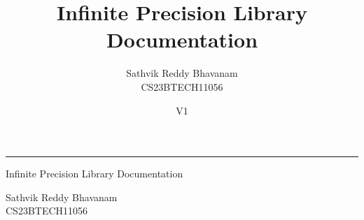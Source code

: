 \documentclass{article} %
\title{\huge \sffamily Infinite Precision Library Documentation}
\author{\sffamily Sathvik Reddy Bhavanam\\[2mm] \sffamily CS23BTECH11056}
\date{V1}
\begin{document}
\thispagestyle{empty}
\vspace*{3cm}
\hspace*{-7mm}\rule{\linewidth}{3pt}
\vspace*{1cm}
\begin{center}
	{\Huge \sffamily Infinite Precision Library Documentation} \\[3em]
\end{center}
{\hfill \Large \sffamily Sathvik Reddy Bhavanam} \\[2em]
{\vspace*{1em} \hfill\large \sffamily CS23BTECH11056}

\newpage


\tableofcontents
\newpage

 
\newpage
\end{document}
